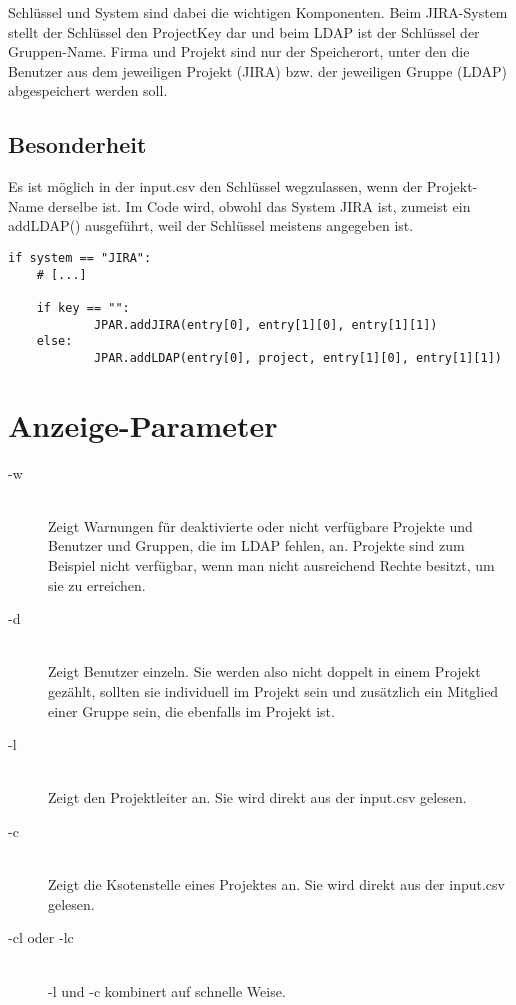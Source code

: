 \documentclass[a4paper,12pt]{report}
\begin{document}
	Schlüssel und System sind dabei die wichtigen Komponenten. Beim JIRA-System stellt der Schlüssel den ProjectKey dar und beim LDAP ist der Schlüssel der Gruppen-Name. Firma und Projekt sind nur der Speicherort, unter den die Benutzer aus dem jeweiligen Projekt (JIRA) bzw. der jeweiligen Gruppe (LDAP) abgespeichert werden soll.	
	
	\subsection{Besonderheit}
	Es ist möglich in der input.csv den Schlüssel wegzulassen, wenn der Projekt-Name derselbe ist. Im Code wird, obwohl das System JIRA ist, zumeist ein addLDAP() ausgeführt, weil der Schlüssel meistens angegeben ist.
	\begin{lstlisting}
if system == "JIRA":
	# [...]
	
	if key == "":
    		JPAR.addJIRA(entry[0], entry[1][0], entry[1][1])
	else:
    		JPAR.addLDAP(entry[0], project, entry[1][0], entry[1][1])
	\end{lstlisting}
	
	\section{Anzeige-Parameter}
	\begin{description}
  	\item[-w] \hfill \\
  	Zeigt Warnungen für deaktivierte oder nicht verfügbare Projekte und Benutzer und Gruppen, die im LDAP fehlen, an. Projekte sind zum Beispiel nicht verfügbar, wenn man nicht ausreichend Rechte besitzt, um sie zu erreichen. 
  	\item[-d] \hfill \\
  	Zeigt Benutzer einzeln. Sie werden also nicht doppelt in einem Projekt gezählt, sollten sie individuell im Projekt sein und zusätzlich ein Mitglied einer Gruppe sein, die ebenfalls im Projekt ist.
  	\item[-l] \hfill \\
  	Zeigt den Projektleiter an. Sie wird direkt aus der input.csv gelesen.
  	\item[-c] \hfill \\
  	Zeigt die Ksotenstelle eines Projektes an. Sie wird direkt aus der input.csv gelesen.
  	\item[-cl oder -lc] \hfill \\
  	-l und -c kombinert auf schnelle Weise.
	\end{description}
\end{document}
